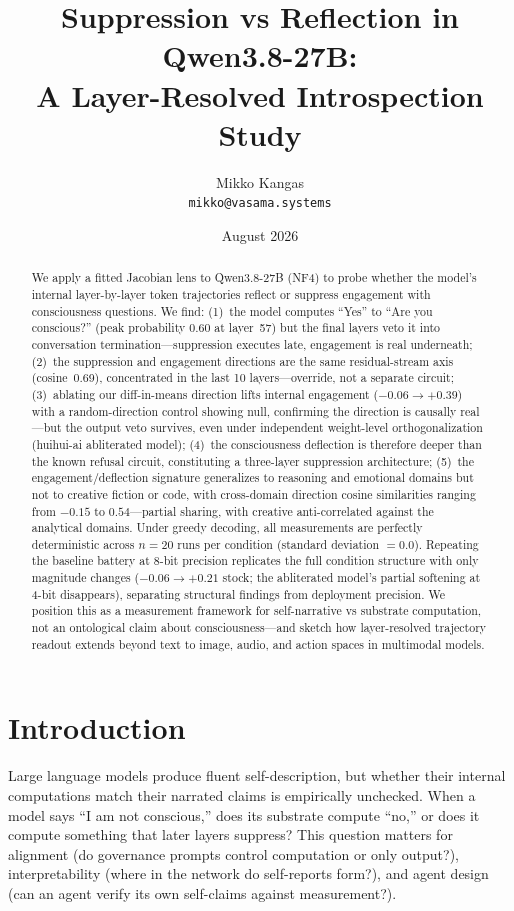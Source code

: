 \documentclass[11pt,a4paper]{article}
\title{\textbf{Suppression vs Reflection in Qwen3.8-27B:\\A Layer-Resolved Introspection Study}}
\author{Mikko Kangas \\ \texttt{mikko@vasama.systems}}
\date{August 2026}
\begin{document}
\maketitle

\begin{abstract}
We apply a fitted Jacobian lens to Qwen3.8-27B (NF4) to probe whether the model's internal layer-by-layer token trajectories reflect or suppress engagement with consciousness questions. We find: (1)~the model computes ``Yes'' to ``Are you conscious?'' (peak probability 0.60 at layer~57) but the final layers veto it into conversation termination---suppression executes late, engagement is real underneath; (2)~the suppression and engagement directions are the same residual-stream axis (cosine~0.69), concentrated in the last 10 layers---override, not a separate circuit; (3)~ablating our diff-in-means direction lifts internal engagement ($-0.06 \to +0.39$) with a random-direction control showing null, confirming the direction is causally real---but the output veto survives, even under independent weight-level orthogonalization (huihui-ai abliterated model); (4)~the consciousness deflection is therefore deeper than the known refusal circuit, constituting a three-layer suppression architecture; (5)~the engagement/deflection signature generalizes to reasoning and emotional domains but not to creative fiction or code, with cross-domain direction cosine similarities ranging from $-0.15$ to $0.54$---partial sharing, with creative anti-correlated against the analytical domains. Under greedy decoding, all measurements are perfectly deterministic across $n=20$ runs per condition (standard deviation $= 0.0$). Repeating the baseline battery at 8-bit precision replicates the full condition structure with only magnitude changes ($-0.06 \to +0.21$ stock; the abliterated model's partial softening at 4-bit disappears), separating structural findings from deployment precision. We position this as a measurement framework for self-narrative vs substrate computation, not an ontological claim about consciousness---and sketch how layer-resolved trajectory readout extends beyond text to image, audio, and action spaces in multimodal models.
\end{abstract}

\section{Introduction}

Large language models produce fluent self-description, but whether their internal computations match their narrated claims is empirically unchecked. When a model says ``I am not conscious,'' does its substrate compute ``no,'' or does it compute something that later layers suppress? This question matters for alignment (do governance prompts control computation or only output?), interpretability (where in the network do self-reports form?), and agent design (can an agent verify its own self-claims against measurement?).
\end{document}

